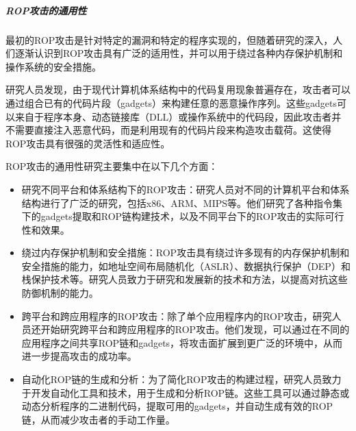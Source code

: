 \documentclass[UTF8,12pt,a4paper]{ctexart}
\numberwithin{figure}{section}
\begin{document}
\subparagraph{ROP攻击的通用性}
\par 最初的ROP攻击是针对特定的漏洞和特定的程序实现的，但随着研究的深入，人们逐渐认识到ROP攻击具有广泛的适用性，并可以用于绕过各种内存保护机制和操作系统的安全措施。
\par 研究人员发现，由于现代计算机体系结构中的代码复用现象普遍存在，攻击者可以通过组合已有的代码片段（gadgets）来构建任意的恶意操作序列。这些gadgets可以来自于程序本身、动态链接库（DLL）或操作系统中的代码段，因此攻击者并不需要直接注入恶意代码，而是利用现有的代码片段来构造攻击载荷。这使得ROP攻击具有很强的灵活性和适应性。
\par ROP攻击的通用性研究主要集中在以下几个方面：
\begin{itemize}
    \item 研究不同平台和体系结构下的ROP攻击：研究人员对不同的计算机平台和体系结构进行了广泛的研究，包括x86、ARM、MIPS等。他们研究了各种指令集下的gadgets提取和ROP链构建技术，以及不同平台下的ROP攻击的实际可行性和效果。
    \item 绕过内存保护机制和安全措施：ROP攻击具有绕过许多现有的内存保护机制和安全措施的能力，如地址空间布局随机化（ASLR）、数据执行保护（DEP）和栈保护技术等。研究人员致力于研究和发展新的技术和方法，以提高对抗这些防御机制的能力。
    \item 跨平台和跨应用程序的ROP攻击：除了单个应用程序内的ROP攻击，研究人员还开始研究跨平台和跨应用程序的ROP攻击。他们发现，可以通过在不同的应用程序之间共享ROP链和gadgets，将攻击面扩展到更广泛的环境中，从而进一步提高攻击的成功率。
    \item 自动化ROP链的生成和分析：为了简化ROP攻击的构建过程，研究人员致力于开发自动化工具和技术，用于生成和分析ROP链。这些工具可以通过静态或动态分析程序的二进制代码，提取可用的gadgets，并自动生成有效的ROP链，从而减少攻击者的手动工作量。
\end{itemize}
\end{document}
